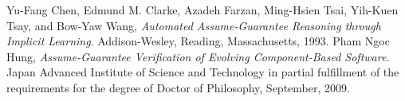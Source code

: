 \documentclass{article}
\begin{document}
\begin{thebibliography}{9}
	Yu-Fang Chen, Edmund M. Clarke, Azadeh Farzan, Ming-Hsien Tsai,
	Yih-Kuen Tsay, and Bow-Yaw Wang, \textit{Automated Assume-Guarantee Reasoning
		through Implicit Learning}. 
	Addison-Wesley, Reading, Massachusetts, 1993.
	Pham Ngoc Hung, \textit{Assume-Guarantee Verification of Evolving Component-Based Software}.
	Japan Advanced Institute of Science and Technology in partial fulfillment of the requirements for the degree of Doctor of Philosophy, September, 2009.
\end{thebibliography}
\end{document}
